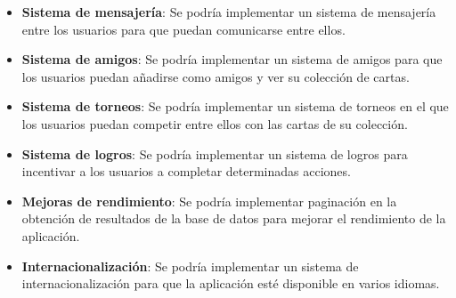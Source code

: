 \begin{itemize}
    \item \textbf{Sistema de mensajería}: Se podría implementar un sistema de mensajería entre los usuarios para que puedan comunicarse entre ellos.
    \item \textbf{Sistema de amigos}: Se podría implementar un sistema de amigos para que los usuarios puedan añadirse como amigos y ver su colección de cartas.
    \item \textbf{Sistema de torneos}: Se podría implementar un sistema de torneos en el que los usuarios puedan competir entre ellos con las cartas de su colección.
    \item \textbf{Sistema de logros}: Se podría implementar un sistema de logros para incentivar a los usuarios a completar determinadas acciones.
    \item \textbf{Mejoras de rendimiento}: Se podría implementar paginación en la obtención de resultados de la base de datos para mejorar el rendimiento de la aplicación.
    \item \textbf{Internacionalización}: Se podría implementar un sistema de internacionalización para que la aplicación esté disponible en varios idiomas.
\end{itemize}
